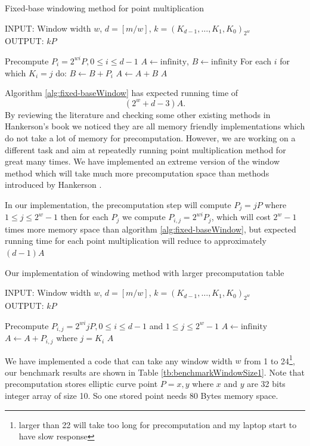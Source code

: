 \begin{algorithm}[h!] 
	\caption{Fixed-base windowing method for point multiplication\cite{hankerson2006guide}}
	\label{alg:fixed-baseWindow}
	INPUT: Window width $w$, $d = [m/w]$, $k=(K_{d-1},\dots,K_1,K_0)_{2^w}$\\
	OUTPUT: $kP$
	\begin{algorithmic} [1]
		\STATE Precompute $P_i = 2^{wi}P, 0 \leq i \leq d-1$
		\STATE $A \leftarrow \text{infinity}$, $B \leftarrow \text{infinity}$
		\STATE For each $i$ for which $K_i = j$ do: $B \leftarrow B + P_i$
		\STATE $A \leftarrow A+B$
		\ENDFOR
		\RETURN $A$
	\end{algorithmic}
\end{algorithm}

Algorithm \ref{alg:fixed-baseWindow} has expected running time of  $$(2^w+d-3)A.$$
By reviewing the literature and checking some other existing methods in Hankerson's book \cite{hankerson2006guide} we noticed they are all memory friendly implementations which do not take a lot of memory for precomputation. However, we are working on a different task and aim at repeatedly running point multiplication method for great many times. We have implemented an extreme version of the window method which will take much more precomputation space than methods introduced by Hankerson \cite{hankerson2006guide}. 

In our implementation, the precomputation step will compute $P_j=jP$ where $ 1 \leq j \leq 2^w-1$ then for each $P_j$ we compute $P_{i,j}=2^{wi}P_j$, which will cost $2^w-1$ times more memory space than algorithm \ref{alg:fixed-baseWindow}, but expected running time for each point multiplication will reduce to approximately $(d-1)A$

\begin{algorithm}[H] 
	\caption{Our implementation of windowing method with larger precomputation table}
	\label{alg:newWindow}
	INPUT: Window width $w$, $d = [m/w]$, $k=(K_{d-1},\dots,K_1,K_0)_{2^w}$\\
	OUTPUT: $kP$
	\begin{algorithmic} [1]
		\STATE Precompute $P_{i,j} = 2^{wi}jP, 0 \leq i \leq d-1$ and $ 1 \leq j \leq 2^w-1$
		\STATE $A \leftarrow \text{infinity}$
		\STATE $A \leftarrow A+P_{i,j}$ where $j = K_i$
		\ENDFOR
		\RETURN $A$
	\end{algorithmic}
\end{algorithm}

We have implemented a code that can take any window width $w$ from 1 to 24\footnote{larger than 22 will take too long for precomputation and my laptop start to have slow response}, our benchmark results are shown in Table \ref{tb:benchmarkWindowSize1}. Note that precomputation stores elliptic curve point $P = {x,y}$ where $x$ and $y$ are 32 bits integer array of size 10. So one stored point needs 80 Bytes memory space. 

